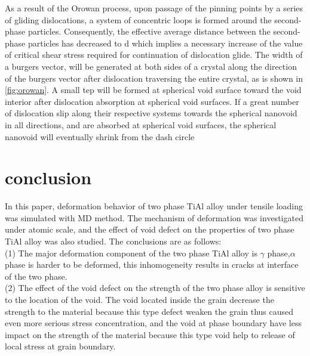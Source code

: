 \documentclass[Unknown,article,submit,moreauthors,pdftex,10pt,a4paper]{Definitions/mdpi}
\begin{document}
As a result of the Orowan process, upon passage of the pinning points by a series of gliding dislocations, a system of concentric loops is formed around the second-phase particles. Consequently, the effective average distance between the second-phase particles has decreased to d which implies a necessary increase of the value of critical shear stress required for continuation of dislocation glide. The width of a burgers vector, will be generated at both sides of a crystal along the direction of the burgers vector after dislocation traversing the entire crystal, as is shown in \ref{fig:orowan}. A small tep will be formed at spherical void surface toward the void interior after dislocation absorption at spherical void surfaces. If a great number of dislocation slip along their respective systems towards the spherical nanovoid in all directions, and are absorbed at spherical void surfaces, the spherical nanovoid will eventually shrink from the dash circle 




\section{conclusion}
In this paper, deformation behavior of two phase TiAl alloy under tensile loading was simulated with MD method. The mechanism of deformation was investigated under atomic scale, and the effect of void defect on the properties of two phase TiAl alloy was also studied.  The conclusions are as follows:\\
(1) The major deformation component of the two phase TiAl alloy is $\gamma$ phase,$\alpha$ phase is harder to be deformed, this inhomogeneity results in cracks at interface of the two phase. \\
(2) The effect of the void defect on the strength of the two phase alloy is sensitive to the location of the void. The void located inside the grain decrease the strength to the material because this type defect weaken the grain thus caused even more serious stress concentration, and the void at phase boundary have less impact on the strength of the material because this type void help to release of local stress at grain boundary.



\end{document}
